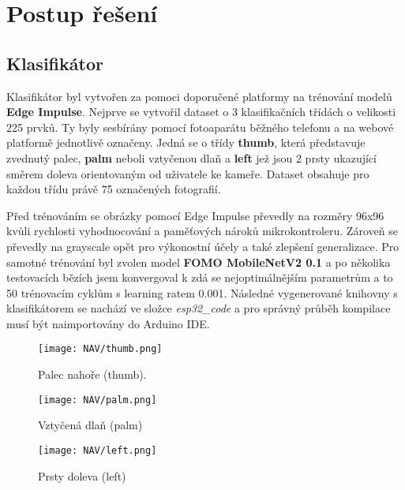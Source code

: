 \documentclass[titlepage, a4paper, 11pt]{article}
\begin{document}
\DTsetlength{1em}{1em}{0.1em}{1pt}{4pt}

\section{Postup řešení}
\subsection{Klasifikátor}
Klasifikátor byl vytvořen za pomoci doporučené platformy na trénování modelů \textbf{Edge Impulse}. Nejprve se vytvořil dataset o 3 klasifikačních třídách o velikosti 225 prvků. Ty byly sesbírány pomocí fotoaparátu běžného telefonu a na webové platformě jednotlivě označeny. Jedná se o třídy \textbf{thumb}, která představuje zvednutý palec, \textbf{palm} neboli vztyčenou dlaň a \textbf{left} jež jsou 2 prsty ukazující směrem doleva orientovaným od uživatele ke kameře. Dataset obsahuje pro každou třídu právě 75 označených fotografií.

Před trénováním se obrázky pomocí Edge Impulse převedly na rozměry 96x96 kvůli rychlosti vyhodnocování a paměťových nároků mikrokontroleru. Zároveň se převedly na grayscale opět pro výkonostní účely a také zlepšení generalizace. Pro samotné trénování byl zvolen model \textbf{FOMO MobileNetV2 0.1} a po několika testovacích bězích jsem konvergoval k zdá se nejoptimálnějším parametrům a to 50 trénovacím cyklům s learning ratem 0.001. Následné vygenerované knihovny s klasifikátorem se nachází ve složce \textit{esp32\_code} a pro správný průběh kompilace musí být naimportovány do Arduino IDE.

\begin{figure*}[h]
\begin{subfigure}{0.32\textwidth}
    \texttt{[image: NAV/thumb.png]}
    \caption{Palec nahoře (thumb).}
    \label{thumb}
\end{subfigure}
\hfill
\begin{subfigure}{0.32\textwidth}
    \texttt{[image: NAV/palm.png]}
    \caption{Vztyčená dlaň (palm)}
    \label{palm}
\end{subfigure}
\hfill
\begin{subfigure}{0.32\textwidth}
    \texttt{[image: NAV/left.png]}
    \caption{Prsty doleva (left)}
    \label{left}
\end{subfigure}
\hfill
\end{figure*}
\end{document}
